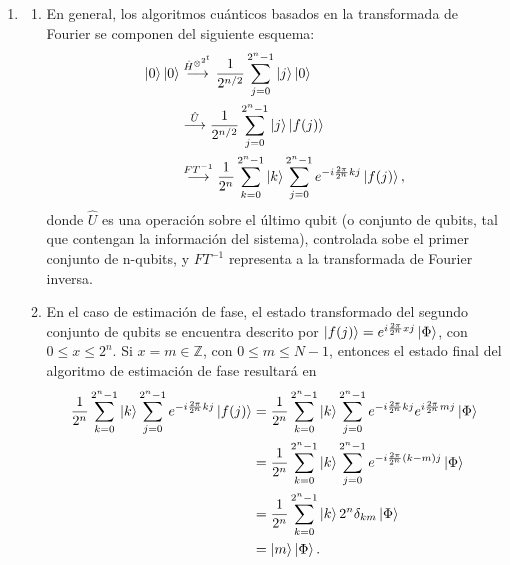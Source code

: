 \documentclass{scrartcl}
\newcommand{\inv}[1]{\frac{1}{#1}}
\DeclareRobustCommand{\[}{\begin{equation}}
\DeclareRobustCommand{\]}{\end{equation}}
\begin{document}
\begin{enumerate}
    
    
    \item \begin{enumerate}
        \item En general, los algoritmos cuánticos basados en la transformada de Fourier se componen del siguiente esquema:
        \begin{align}
            \ket{0}\ket{0} &\overset{\hat{H}^{\otimes^{2^t}}}{\longrightarrow} \inv{2^{n/2}} \sum_{j = 0}^{2^n - 1} \ket{j} \ket{0} \\
                &\overset{\hat{U}}{\longrightarrow} \inv{2^{n/2}} \sum_{j = 0}^{2^n - 1} \ket{j} \ket{f(j)} \\ %
                &\overset{FT^{-1}}{\longrightarrow} \inv{2^n} \sum_{k = 0}^{2^n - 1} \ket{k} \sum_{j = 0}^{2^n - 1} e^{-i \frac{2\pi}{2^n} kj} \ket{f(j)},
        \end{align}
        donde $\hat{U}$ es una operación sobre el último qubit (o conjunto de qubits, tal que contengan la información del sistema), controlada sobe el primer conjunto de n-qubits, y $FT^{-1}$ representa a la transformada de Fourier inversa.
        
        \item En el caso de estimación de fase, el estado transformado del segundo conjunto de qubits se encuentra descrito por $\ket{f(j)} = e^{i \frac{2\pi}{2^n} xj} \ket{\Phi}$, con $0 \leq x \leq 2^n$. Si $x = m \in \mathds{Z}$, con $0 \leq m \leq N - 1$, entonces el estado final del algoritmo de estimación de fase resultará en
        \begin{align}
            \inv{2^n} \sum_{k = 0}^{2^n - 1} \ket{k} \sum_{j = 0}^{2^n - 1} e^{-i \frac{2\pi}{2^n} kj} \ket{f(j)} &= \inv{2^n} \sum_{k = 0}^{2^n - 1} \ket{k} \sum_{j = 0}^{2^n - 1} e^{-i \frac{2\pi}{2^n} kj} e^{i \frac{2\pi}{2^n} mj} \ket{\Phi} \\
                &= \inv{2^n} \sum_{k = 0}^{2^n - 1} \ket{k} \sum_{j = 0}^{2^n - 1} e^{-i \frac{2\pi}{2^n} (k - m) j} \ket{\Phi} \\
                &= \inv{2^n} \sum_{k = 0}^{2^n - 1} \ket{k} 2^n \delta_{k m} \ket{\Phi} \\
                &= \ket{m} \ket{\Phi}.
        \end{align}
        

\end{enumerate}
\end{enumerate}
\end{document}
